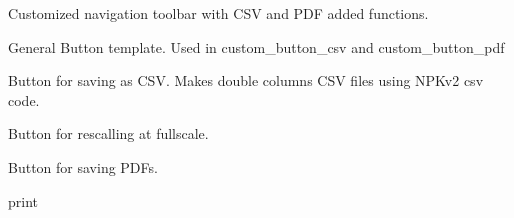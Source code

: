 \documentclass[letterpaper,10pt,openany,oneside]{sphinxmanual}
\begin{document}
\begin{fulllineitems}
\label{rst/visu2d:Visu.profile_popup.NavigToolbar}
Customized navigation toolbar with CSV and PDF added functions.

\begin{fulllineitems}
\label{rst/visu2d:Visu.profile_popup.NavigToolbar.Button_template}
General Button template. 
Used in custom\_button\_csv and custom\_button\_pdf

\end{fulllineitems}


\begin{fulllineitems}
\label{rst/visu2d:Visu.profile_popup.NavigToolbar.custom_button_csv}
Button for saving as CSV. 
Makes double columns CSV files using NPKv2 csv code.

\end{fulllineitems}


\begin{fulllineitems}
\label{rst/visu2d:Visu.profile_popup.NavigToolbar.custom_button_fullscale}
Button for rescalling at fullscale.

\end{fulllineitems}


\begin{fulllineitems}
\label{rst/visu2d:Visu.profile_popup.NavigToolbar.custom_button_pdf}
Button for saving PDFs.

\end{fulllineitems}


\begin{fulllineitems}
\label{rst/visu2d:Visu.profile_popup.NavigToolbar.pr}
print

\end{fulllineitems}


\end{fulllineitems}
\end{document}
